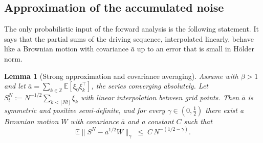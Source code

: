 \documentclass[a4paper,fleqn]{cas-dc}
\newtheorem{lemma}[theorem]{Lemma}
\theoremstyle{definition}
\newcommand{\E}{\mathbb{E}}
\begin{document}
\subsection{Approximation of the accumulated noise}

The only probabilistic input of the forward analysis is the following statement. It
says that the partial sums of the driving sequence, interpolated linearly, behave like
a Brownian motion with covariance $\bar a$ up to an error that is small in H\"older
norm.

\begin{lemma}[Strong approximation and covariance averaging]
\label{lem:strongapp}
Assume  with $\beta>1$ and let
$\bar a=\sum_{k\in\mathbb{Z}}\E[\xi_{0}\xi_{k}^{\top}]$, the series converging
absolutely. Let
$S^{N}_{t}:=N^{-1/2}\sum_{k<\lfloor Nt\rfloor}\xi_{k}$ with linear interpolation
between grid points. Then $\bar a$ is symmetric and positive semi-definite, and for
every $\gamma\in(0,\tfrac12)$ there exist a Brownian motion $W$ with covariance
$\bar a$ and a constant $C$ such that
\begin{equation}
\E\bigl\lVert S^{N}-\bar a^{1/2}W\bigr\rVert_{\gamma}
\;\le\; C\,N^{-(1/2-\gamma)} .
\label{eq:strongapp}
\end{equation}
\end{lemma}
\end{document}
